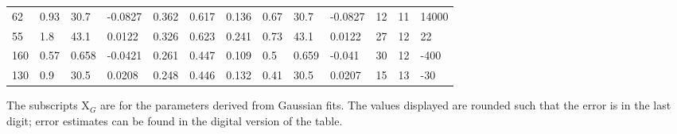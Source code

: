 \begin{table}[htp]
{\begin{tabular}{lllllllllllll}
62 & 0.93 & 30.7 & -0.0827 & 0.362 & 0.617 & 0.136 & 0.67 & 30.7 & -0.0827 & 12 & 11 & 14000 \\
55 & 1.8 & 43.1 & 0.0122 & 0.326 & 0.623 & 0.241 & 0.73 & 43.1 & 0.0122 & 27 & 12 & 22 \\
160 & 0.57 & 0.658 & -0.0421 & 0.261 & 0.447 & 0.109 & 0.5 & 0.659 & -0.041 & 30 & 12 & -400 \\
130 & 0.9 & 30.5 & 0.0208 & 0.248 & 0.446 & 0.132 & 0.41 & 30.5 & 0.0207 & 15 & 13 & -30 \\
\hline
\end{tabular}
}\par
The subscripts X${_G}$ are for the parameters derived from Gaussian fits.  The values displayed are rounded such that the error is in the last digit; error estimates can be found in the digital version of the table.
\end{table}
